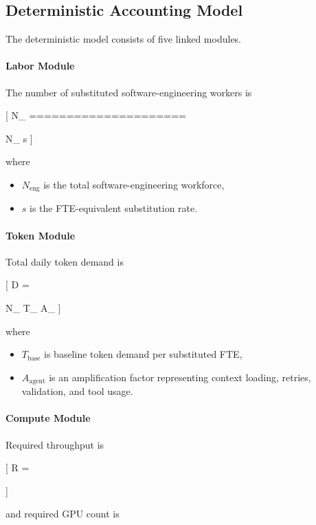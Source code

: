 \subsection{Deterministic Accounting Model}

The deterministic model consists of five linked modules.

\paragraph{Labor Module}

The number of substituted software-engineering workers is

[
N_{}
=====================

N_{}
\cdot
s
]

where

\begin{itemize}
\item $N_{\mathrm{eng}}$ is the total software-engineering workforce,
\item $s$ is the FTE-equivalent substitution rate.
\end{itemize}

\paragraph{Token Module}

Total daily token demand is

[
D
=

N_{}
\cdot
T_{}
\cdot
A_{}
]

where

\begin{itemize}
\item $T_{\mathrm{base}}$ is baseline token demand per substituted FTE,
\item $A_{\mathrm{agent}}$ is an amplification factor representing context loading, retries, validation, and tool usage.
\end{itemize}

\paragraph{Compute Module}

Required throughput is

[
R
=

]

and required GPU count is

